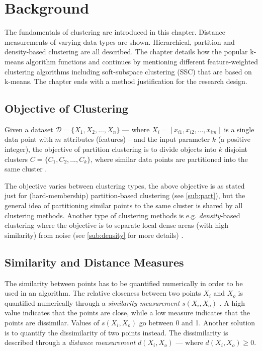\documentclass[../report.tex]{subfiles}
\begin{document}
\chapter{Background}\label{ch:back}
The fundamentals of clustering are introduced in this chapter. Distance measurements of varying data-types are shown. Hierarchical, partition and density-based clustering are all described. The chapter details how the popular k-means algorithm functions and continues by mentioning different feature-weighted clustering algorithms including soft-subspace clustering (SSC) that are based on k-means. The chapter ends with a method justification for the research design.

\section{Objective of Clustering}
Given a dataset $\mathcal{D} = \{X_{ 1 }, X_{ 2 },..., X_{ n } \}$ --- where $X_i = [x_{i1}, x_{i2},...,x_{im} ]$ is a single data point with $m$ attributes (features) -- and the input parameter $k$ (a positive integer), the objective of partition clustering is to divide objects into $k$ disjoint clusters ${C} = \{C_1, C_2,..., C_k \}$, where similar data points are partitioned into the same cluster \cite{Huang97clusteringlarge}.

The objective varies between clustering types, the above objective is as stated just for (hard-membership) partition-based clustering (see \cref{sub:part}), but the general idea of partitioning similar points to the same cluster is shared by all clustering methods. Another type of clustering methods is e.g. \textit{density}-based clustering where the objective is to separate local dense areas (with high similarity) from noise (see \cref{sub:density} for more details) \cite{Ester1996}.

\section{Similarity and Distance Measures}
The similarity between points has to be quantified numerically in order to be used in an algorithm. The relative closeness between two points $X_i$ and $X_o$ is quantified numerically through a \textit{similarity measurement} $s(X_i, X_o)$ \cite{diday1976clustering}. A high value indicates that the points are close, while a low measure indicates that the points are dissimilar. Values of $s(X_i, X_o)$ go between 0 and 1. Another solution is to quantify the dissimilarity of two points instead. The dissimilarity is described through a \textit{distance measurement} $d(X_i, X_o)$ --- where $d(X_i, X_o) \geq 0$.
\end{document}
